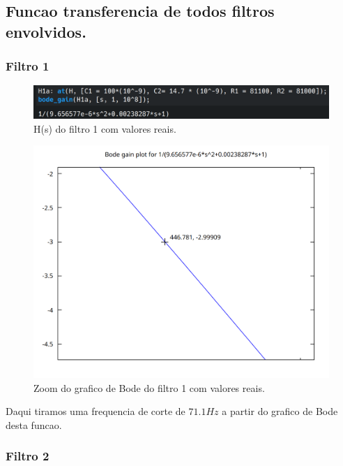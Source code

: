 \documentclass[12pt,twoside, a4paper, twocolumn]{article}
\begin{document}
\subsection{Funcao transferencia de todos filtros envolvidos.}

\subsubsection{Filtro 1}

\begin{figure}[h]
    \centering
    \includegraphics[width=1\columnwidth]{images/hsfiltro1.png}
    \caption{H(s) do filtro 1 com valores reais.}
\end{figure}

\begin{figure}[h]
    \centering
    \includegraphics[width=1\columnwidth]{images/zoomH1.png}
    \caption{Zoom do grafico de Bode do filtro 1 com valores reais.}
\end{figure}

Daqui tiramos uma frequencia de corte de $71.1Hz$ a partir do grafico de Bode desta funcao.


\subsubsection{Filtro 2}
\end{document}
